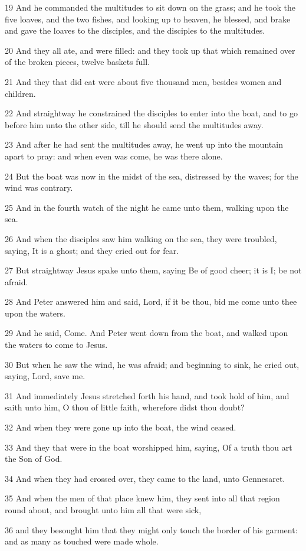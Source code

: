 \par 19 And he commanded the multitudes to sit down on the grass; and he took the five loaves, and the two fishes, and looking up to heaven, he blessed, and brake and gave the loaves to the disciples, and the disciples to the multitudes.
\par 20 And they all ate, and were filled: and they took up that which remained over of the broken pieces, twelve baskets full.
\par 21 And they that did eat were about five thousand men, besides women and children.
\par 22 And straightway he constrained the disciples to enter into the boat, and to go before him unto the other side, till he should send the multitudes away.
\par 23 And after he had sent the multitudes away, he went up into the mountain apart to pray: and when even was come, he was there alone.
\par 24 But the boat was now in the midst of the sea, distressed by the waves; for the wind was contrary.
\par 25 And in the fourth watch of the night he came unto them, walking upon the sea.
\par 26 And when the disciples saw him walking on the sea, they were troubled, saying, It is a ghost; and they cried out for fear.
\par 27 But straightway Jesus spake unto them, saying Be of good cheer; it is I; be not afraid.
\par 28 And Peter answered him and said, Lord, if it be thou, bid me come unto thee upon the waters.
\par 29 And he said, Come. And Peter went down from the boat, and walked upon the waters to come to Jesus.
\par 30 But when he saw the wind, he was afraid; and beginning to sink, he cried out, saying, Lord, save me.
\par 31 And immediately Jesus stretched forth his hand, and took hold of him, and saith unto him, O thou of little faith, wherefore didst thou doubt?
\par 32 And when they were gone up into the boat, the wind ceased.
\par 33 And they that were in the boat worshipped him, saying, Of a truth thou art the Son of God.
\par 34 And when they had crossed over, they came to the land, unto Gennesaret.
\par 35 And when the men of that place knew him, they sent into all that region round about, and brought unto him all that were sick,
\par 36 and they besought him that they might only touch the border of his garment: and as many as touched were made whole.

